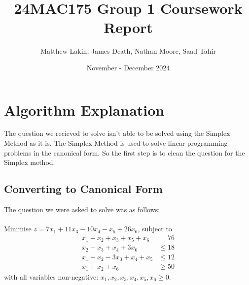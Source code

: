 \documentclass{article}
\title{24MAC175 Group 1 Coursework Report}
\author{Matthew Lakin, James Death, Nathan Moore, Saad Tahir}
\date{November - December 2024}
\numberwithin{equation}{section}
\begin{document}
\maketitle
\newpage
\tableofcontents
\newpage

\section{Algorithm Explanation}
The question we recieved to solve isn't able to be solved using the Simplex Method as it is. The Simplex Method is used to solve linear programming problems in the canonical form. So the first step is to clean the question for the Simplex method.
\subsection{Converting to Canonical Form}
The question we were asked to solve was as follows: \\ \\
Minimise $z = 7x_1 + 11x_3 - 10x_4 - x_5 + 26x_6$, subject to
\begin{align}
    x_1 - x_2 + x_3 + x_5 + x_6 &= 76  \label{lpp1:constraint1} \\
    x_2 - x_3 + x_4 + 3x_6 &\leq 18 \label{lpp1:constraint2} \\
    x_1 + x_2 - 3x_3 + x_4 + x_5 &\leq 12 \label{lpp1:constraint3} \\
    x_1 + x_2 + x_6 &\geq 50 \label{lpp1:constraint4}
\end{align}
with all variables non-negative: $x_1, x_2, x_3, x_4, x_5, x_6 \geq 0$. \\ 
\end{document}
